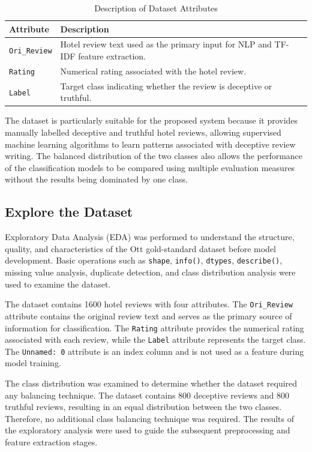 \documentclass[12pt,a4paper]{report}
\begin{document}
\begin{table}[H]
\centering
\small
\renewcommand{\arraystretch}{1.3}
\begin{tabularx}{0.95\textwidth}{|>{\raggedright\arraybackslash}p{}|X|}
\hline
\textbf{Attribute} & \textbf{Description} \\
\hline
\texttt{Ori\_Review} & Hotel review text used as the primary input for NLP and TF-IDF feature extraction. \\
\hline
\texttt{Rating} & Numerical rating associated with the hotel review. \\
\hline
\texttt{Label} & Target class indicating whether the review is deceptive or truthful. \\
\hline
\end{tabularx}
\caption{Description of Dataset Attributes}
\label{tab:datasetattributes}
\end{table}

The dataset is particularly suitable for the proposed system because it provides manually labelled deceptive and truthful hotel reviews, allowing supervised machine learning algorithms to learn patterns associated with deceptive review writing. The balanced distribution of the two classes also allows the performance of the classification models to be compared using multiple evaluation measures without the results being dominated by one class.

\subsection{Explore the Dataset}

Exploratory Data Analysis (EDA) was performed to understand the structure, quality, and characteristics of the Ott gold-standard dataset before model development. Basic operations such as \texttt{shape}, \texttt{info()}, \texttt{dtypes}, \texttt{describe()}, missing value analysis, duplicate detection, and class distribution analysis were used to examine the dataset.

The dataset contains 1600 hotel reviews with four attributes. The \texttt{Ori\_Review} attribute contains the original review text and serves as the primary source of information for classification. The \texttt{Rating} attribute provides the numerical rating associated with each review, while the \texttt{Label} attribute represents the target class. The \texttt{Unnamed: 0} attribute is an index column and is not used as a feature during model training.

The class distribution was examined to determine whether the dataset required any balancing technique. The dataset contains 800 deceptive reviews and 800 truthful reviews, resulting in an equal distribution between the two classes. Therefore, no additional class balancing technique was required. The results of the exploratory analysis were used to guide the subsequent preprocessing and feature extraction stages.
\end{document}
